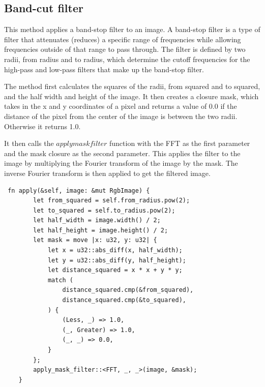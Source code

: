 \documentclass[12pt]{article}
\begin{document}
\subsection{Band-cut filter}
This method applies a band-stop filter to an image. A band-stop filter is a type of filter that attenuates (reduces) a specific range of frequencies while allowing frequencies outside of that range to pass through. The filter is defined by two radii, from radius and to radius, which determine the cutoff frequencies for the high-pass and low-pass filters that make up the band-stop filter.

The method first calculates the squares of the radii, from squared and to squared, and the half width and height of the image. It then creates a closure mask, which takes in the x and y coordinates of a pixel and returns a value of 0.0 if the distance of the pixel from the center of the image is between the two radii. Otherwise it returns 1.0.

It then calls the $apply mask filter$ function with the FFT as the first parameter and the mask closure as the second parameter. This applies the filter to the image by multiplying the Fourier transform of the image by the mask. The inverse Fourier transform is then applied to get the filtered image. 
\begin{lstlisting}
 fn apply(&self, image: &mut RgbImage) {
        let from_squared = self.from_radius.pow(2);
        let to_squared = self.to_radius.pow(2);
        let half_width = image.width() / 2;
        let half_height = image.height() / 2;
        let mask = move |x: u32, y: u32| {
            let x = u32::abs_diff(x, half_width);
            let y = u32::abs_diff(y, half_height);
            let distance_squared = x * x + y * y;
            match (
                distance_squared.cmp(&from_squared),
                distance_squared.cmp(&to_squared),
            ) {
                (Less, _) => 1.0,
                (_, Greater) => 1.0,
                (_, _) => 0.0,
            }
        };
        apply_mask_filter::<FFT, _, _>(image, &mask);
    }
\end{lstlisting}
\end{document}
